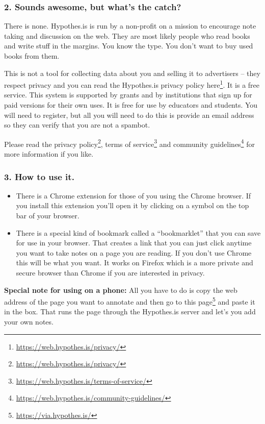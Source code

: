 \documentclass[
  12pt, openany]{book}
\makeatletter
\renewcommand{\href}[2]{#2\footnote{\url{#1}}}
\newenvironment{kframe}{%
\medskip{}
\setlength{\fboxsep}{.8em}
 \def\at@end@of@kframe{}%
 \ifinner\ifhmode%
  \def\at@end@of@kframe{\end{minipage}}%
  \begin{minipage}{\columnwidth}%
 \fi\fi%
 \def\FrameCommand##1{\hskip\@totalleftmargin \hskip-\fboxsep
 \colorbox{shadecolor}{##1}\hskip-\fboxsep
     \hskip-\linewidth \hskip-\@totalleftmargin \hskip\columnwidth}%
 \MakeFramed {\advance\hsize-\width
   \@totalleftmargin\z@ \linewidth\hsize
   \@setminipage}}%
 {\par\unskip\endMakeFramed%
 \at@end@of@kframe}
\newenvironment{rmdblock}[1]
  {
  \begin{itemize}
  \renewcommand{\labelitemi}{
    \raisebox{-.7\height}[0pt][0pt]{
      {\setkeys{Gin}{width=3em,keepaspectratio}\texttt{[image: img/\#1]}}
    }
  }
  \setlength{\fboxsep}{1em}
  \begin{kframe}
  \item
  }
  {
  \end{kframe}
  \end{itemize}
  }
\newenvironment{note}
  {\begin{rmdblock}{note}}
  {\end{rmdblock}}
\theoremstyle{definition}
\theoremstyle{definition}
\theoremstyle{definition}
\theoremstyle{remark}
\makeatother
\begin{document}
\hypertarget{sounds-awesome-but-whats-the-catch}{%
\subsubsection*{2. Sounds awesome, but what's the catch?}\label{sounds-awesome-but-whats-the-catch}}


There is none. Hypothes.is is run by a non-profit on a mission to encourage note taking and discussion on the web. They are most likely people who read books and write stuff in the margins. You know the type. You don't want to buy used books from them.

This is not a tool for collecting data about you and selling it to advertisers -- they respect privacy and you can read \href{https://web.hypothes.is/privacy/}{the Hypothes.is privacy policy here}. It is a free service. This system is supported by grants and by institutions that sign up for paid versions for their own uses. It is free for use by educators and students. You will need to register, but all you will need to do this is provide an email address so they can verify that you are not a spambot.

Please read the \href{https://web.hypothes.is/privacy/}{privacy policy}, \href{https://web.hypothes.is/terms-of-service/}{terms of service} and \href{https://web.hypothes.is/community-guidelines/}{community guidelines} for more information if you like.

\hypertarget{how-to-use-it.}{%
\subsubsection*{3. How to use it.}\label{how-to-use-it.}}


\begin{itemize}
\item
  There is a Chrome extension for those of you using the Chrome browser. If you install this extension you'll open it by clicking on a symbol on the top bar of your browser.
\item
  There is a special kind of bookmark called a ``bookmarklet'' that you can save for use in your browser. That creates a link that you can just click anytime you want to take notes on a page you are reading. If you don't use Chrome this will be what you want. It works on Firefox which is a more private and secure browser than Chrome if you are interested in privacy.
\end{itemize}

\begin{note}

\textbf{Special note for using on a phone:} All you have to do is copy the web address of the page you want to annotate and then \href{https://via.hypothes.is/}{go to this page} and paste it in the box. That runs the page through the Hypothes.is server and let's you add your own notes.

\end{note}
\end{document}
